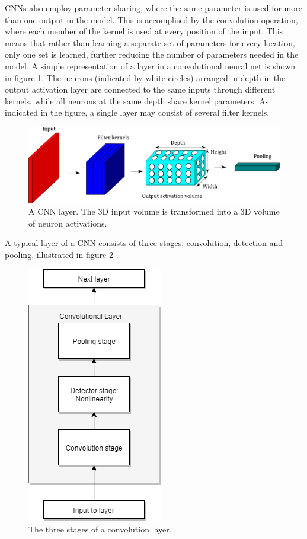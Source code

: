 CNNs also employ parameter sharing, where the same parameter is used for more than one output in the model. This is accomplised by the convolution operation, where each member of the kernel is used at every position of the input. This means that rather than learning a separate set of parameters for every location, only one set is learned, further reducing the number of parameters needed in the model. A simple representation of a layer in a convolutional neural net is shown in figure \ref{fig:conv}. The neurons (indicated by white circles) arranged in depth in the output activation layer are connected to the same inputs through different kernels, while all neurons at the same depth share kernel parameters. As indicated in the figure, a single layer may consist of several filter kernels.
\begin{figure}[H]
	\centering
	\includegraphics[width=.7\linewidth]{fig/conv_simple.png}
	\caption{A CNN layer. The 3D input volume is transformed into a 3D volume of neuron activations.}
    \label{fig:conv}
\end{figure}
A typical layer of a CNN consists of three stages; convolution, detection and pooling, illustrated in figure \ref{fig:conv_layer} \cite{Goodfellow-et-al-2016}.
\begin{figure}[H]
	\centering
	\includegraphics[width=.4\linewidth]{fig/conv.png}
	\caption{The three stages of a convolution layer.}
	\label{fig:conv_layer}
\end{figure}
